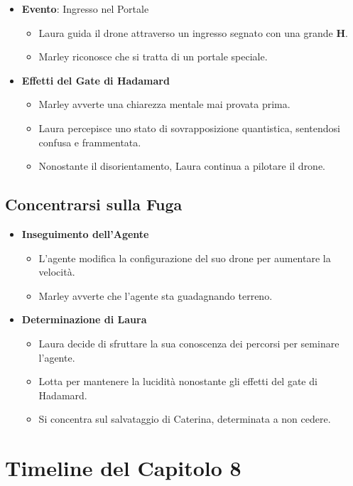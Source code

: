 \begin{itemize}
    \item \textbf{Evento}: Ingresso nel Portale
    \begin{itemize}
        \item Laura guida il drone attraverso un ingresso segnato con una grande \textbf{H}.
        \item Marley riconosce che si tratta di un portale speciale.
    \end{itemize}
    \item \textbf{Effetti del Gate di Hadamard}
    \begin{itemize}
        \item Marley avverte una chiarezza mentale mai provata prima.
        \item Laura percepisce uno stato di sovrapposizione quantistica, sentendosi confusa e frammentata.
        \item Nonostante il disorientamento, Laura continua a pilotare il drone.
    \end{itemize}
\end{itemize}

\subsection*{Concentrarsi sulla Fuga}

\begin{itemize}
    \item \textbf{Inseguimento dell'Agente}
    \begin{itemize}
        \item L'agente modifica la configurazione del suo drone per aumentare la velocità.
        \item Marley avverte che l'agente sta guadagnando terreno.
    \end{itemize}
    \item \textbf{Determinazione di Laura}
    \begin{itemize}
        \item Laura decide di sfruttare la sua conoscenza dei percorsi per seminare l'agente.
        \item Lotta per mantenere la lucidità nonostante gli effetti del gate di Hadamard.
        \item Si concentra sul salvataggio di Caterina, determinata a non cedere.
    \end{itemize}
\end{itemize}
\section*{Timeline del Capitolo 8}

